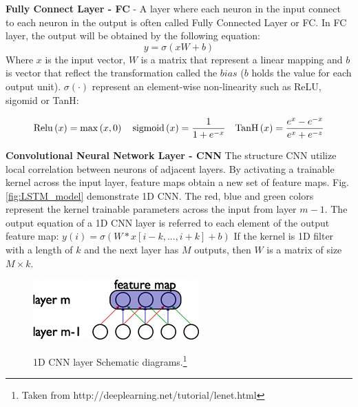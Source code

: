 \documentclass[
12pt, %
english, %
doublespacing, %
headsepline, %
]{MastersDoctoralThesis} %
\begin{document}
\textbf{Fully Connect Layer - FC} - A layer where each neuron in the input connect to each neuron in the output is often called Fully Connected Layer or FC. In FC layer, the output will be obtained by the following equation:
\[y=\sigma \left( {xW + b} \right)\]
Where $x$ is the input vector, $W$ is a matrix that represent a linear mapping and $b$ is vector that reflect the transformation called the $bias$ ($b$ holds the value for each output unit). $\sigma \left( \cdot \right)$ represent an element-wise non-linearity such as ReLU, sigomid or TanH:

\[{\rm{Relu}}\left( x \right) = \max \left( {x,0} \right)\,\,\,\,\,\,{\rm{sigmoid}}\left( x \right) = \frac{1}{{1 + {e^{ - x}}}}\,\,\,\,\,\,{\mathop{\rm Tan}\nolimits} {\rm{H}}\left( x \right) = \frac{{{e^x} - {e^{ - x}}}}{{{e^x} + {e^{ - z}}}}\]




 
 
 
\textbf{Convolutional Neural Network Layer - CNN } The structure CNN utilize local correlation between neurons of adjacent layers. By activating a trainable kernel across the input layer, feature maps obtain a new set of feature maps. Fig.\ref{fig:LSTM_model} demonstrate 1D CNN. The red, blue and green colors represent the kernel trainable parameters across the input from layer $m-1$. The output equation of a 1D CNN layer is referred to each element of the output feature map: 
$y\left( i \right) = \sigma \left( {W * x\left[ {i - k,...,i + k} \right] + b} \right)$
If the kernel is 1D filter with a length of $k$ and the next layer has $M$ outputs, then $W$ is a matrix of size $M \times k$.

\begin{figure}[t]
			\centering
			\includegraphics{conv_1D_nn.png}
			\label{fig:1D_CNN_layer}
	\caption[1D CNN layer Schematic diagrams]{1D CNN layer Schematic diagrams.\footnote{Taken from http://deeplearning.net/tutorial/lenet.html}}
\end{figure}
\end{document}
